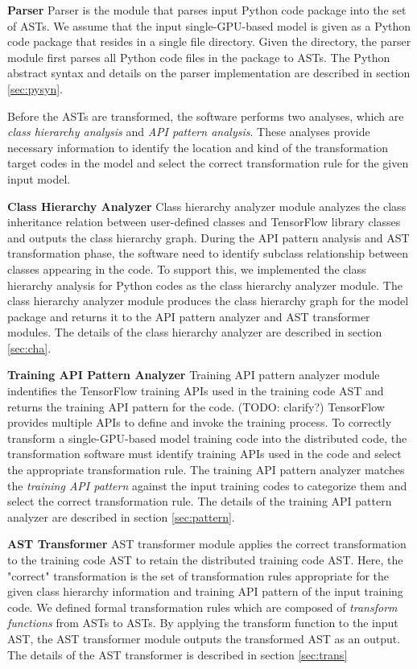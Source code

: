 \textbf{Parser}
Parser is the module that parses input Python code package
into the set of ASTs.
We assume that the input single-GPU-based model is given as a Python code
package that resides in a single file directory.
Given the directory, the parser module first parses all Python code files
in the package to ASTs.
The Python abstract syntax and details on the parser implementation
are described in section \ref{sec:pysyn}.

Before the ASTs are transformed, the software performs two analyses, 
which are \textit{class hierarchy analysis} and 
\textit{API pattern analysis}.
These analyses provide necessary information to identify the
location and kind of the transformation target codes in the model
and select the correct transformation rule for the given input model.

\textbf{Class Hierarchy Analyzer}
Class hierarchy analyzer module analyzes the class inheritance relation
between user-defined classes and TensorFlow library classes and
outputs the class hierarchy graph.
During the API pattern analysis and AST transformation phase,
the software need to identify subclass relationship between
classes appearing in the code.
To support this, we implemented the class hierarchy analysis
for Python codes as the class hierarchy analyzer module.
The class hierarchy analyzer module produces the class hierarchy graph
for the model package and returns it to the API pattern analyzer and 
AST transformer modules. The details of the class hierarchy analyzer are
described in section \ref{sec:cha}.

\textbf{Training API Pattern Analyzer}
Training API pattern analyzer module 
indentifies the TensorFlow training APIs used in the training code AST
and returns the training API pattern for the code. (TODO: clarify?)
TensorFlow provides multiple APIs to define and invoke the training process.
To correctly transform a single-GPU-based model training code into
the distributed code, the transformation software must identify
training APIs used in the code and select the appropriate transformation rule.
The training API pattern analyzer matches the \textit{training API pattern}
against the input training codes to categorize them and select
the correct transformation rule. The details of the training API pattern
analyzer are described in section \ref{sec:pattern}.

\textbf{AST Transformer}
AST transformer module applies the correct transformation to the
training code AST to retain the distributed training code AST.
Here, the "correct" transformation is the set of transformation rules
appropriate for the given class hierarchy information and
training API pattern of the input training code.
We defined formal transformation rules which are composed of
\textit{transform functions} from ASTs to ASTs.
By applying the transform function to the input AST,
the AST transformer module outputs the transformed AST as an output.
The details of the AST transformer is described in section \ref{sec:trans}
